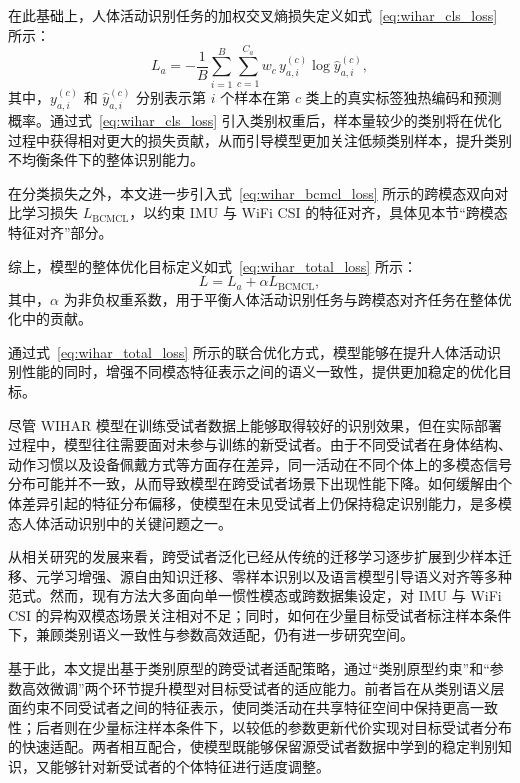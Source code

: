 在此基础上，人体活动识别任务的加权交叉熵损失定义如式~\eqref{eq:wihar_cls_loss} 所示：
\begin{equation}
L_a = - \frac{1}{B}\sum_{i=1}^{B}\sum_{c=1}^{C_a}
w_c \, y_{a,i}^{(c)} \log \hat{y}_{a,i}^{(c)},
\label{eq:wihar_cls_loss}
\end{equation}
其中，$y_{a,i}^{(c)}$ 和 $\hat{y}_{a,i}^{(c)}$ 分别表示第 $i$ 个样本在第 $c$ 类上的真实标签独热编码和预测概率。通过式~\eqref{eq:wihar_cls_loss} 引入类别权重后，样本量较少的类别将在优化过程中获得相对更大的损失贡献，从而引导模型更加关注低频类别样本，提升类别不均衡条件下的整体识别能力。

在分类损失之外，本文进一步引入式~\eqref{eq:wihar_bcmcl_loss} 所示的跨模态双向对比学习损失 $L_{\mathrm{BCMCL}}$，以约束 IMU 与 WiFi CSI 的特征对齐，具体见本节“跨模态特征对齐”部分。

综上，模型的整体优化目标定义如式~\eqref{eq:wihar_total_loss} 所示：
\begin{equation}
L = L_a + \alpha L_{\mathrm{BCMCL}},
\label{eq:wihar_total_loss}
\end{equation}
其中，$\alpha$ 为非负权重系数，用于平衡人体活动识别任务与跨模态对齐任务在整体优化中的贡献。

通过式~\eqref{eq:wihar_total_loss} 所示的联合优化方式，模型能够在提升人体活动识别性能的同时，增强不同模态特征表示之间的语义一致性，提供更加稳定的优化目标。


尽管 WIHAR 模型在训练受试者数据上能够取得较好的识别效果，但在实际部署过程中，模型往往需要面对未参与训练的新受试者。由于不同受试者在身体结构、动作习惯以及设备佩戴方式等方面存在差异，同一活动在不同个体上的多模态信号分布可能并不一致，从而导致模型在跨受试者场景下出现性能下降。如何缓解由个体差异引起的特征分布偏移，使模型在未见受试者上仍保持稳定识别能力，是多模态人体活动识别中的关键问题之一。

从相关研究的发展来看，跨受试者泛化已经从传统的迁移学习逐步扩展到少样本迁移、元学习增强、源自由知识迁移、零样本识别以及语言模型引导语义对齐等多种范式\cite{ganesha2024few,vettoruzzo2025efficient,xue2025mobhar,su2025imuzero,jia2024holistic,yan2025large}。然而，现有方法大多面向单一惯性模态或跨数据集设定，对 IMU 与 WiFi CSI 的异构双模态场景关注相对不足；同时，如何在少量目标受试者标注样本条件下，兼顾类别语义一致性与参数高效适配，仍有进一步研究空间。

基于此，本文提出基于类别原型的跨受试者适配策略，通过“类别原型约束”和“参数高效微调”两个环节提升模型对目标受试者的适应能力。前者旨在从类别语义层面约束不同受试者之间的特征表示，使同类活动在共享特征空间中保持更高一致性；后者则在少量标注样本条件下，以较低的参数更新代价实现对目标受试者分布的快速适配。两者相互配合，使模型既能够保留源受试者数据中学到的稳定判别知识，又能够针对新受试者的个体特征进行适度调整。


